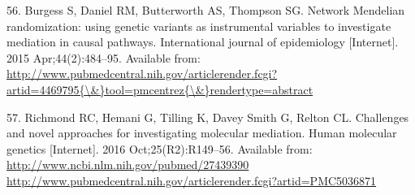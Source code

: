 \documentclass[]{article}
\begin{document}
\hypertarget{ref-Burgess2015}{}
56. Burgess S, Daniel RM, Butterworth AS, Thompson SG. Network Mendelian
randomization: using genetic variants as instrumental variables to
investigate mediation in causal pathways. International journal of
epidemiology {[}Internet{]}. 2015 Apr;44(2):484--95. Available from:
\href{http://www.pubmedcentral.nih.gov/articlerender.fcgi?artid=4469795\%7B/\&\%7Dtool=pmcentrez\%7B/\&\%7Drendertype=abstract}{http://www.pubmedcentral.nih.gov/articlerender.fcgi?artid=4469795\{\textbackslash{}\&\}tool=pmcentrez\{\textbackslash{}\&\}rendertype=abstract}

\hypertarget{ref-Richmond2016}{}
57. Richmond RC, Hemani G, Tilling K, Davey Smith G, Relton CL.
Challenges and novel approaches for investigating molecular mediation.
Human molecular genetics {[}Internet{]}. 2016 Oct;25(R2):R149--56.
Available from:
\href{http://www.ncbi.nlm.nih.gov/pubmed/27439390\%20http://www.pubmedcentral.nih.gov/articlerender.fcgi?artid=PMC5036871}{http://www.ncbi.nlm.nih.gov/pubmed/27439390 http://www.pubmedcentral.nih.gov/articlerender.fcgi?artid=PMC5036871}
\end{document}
